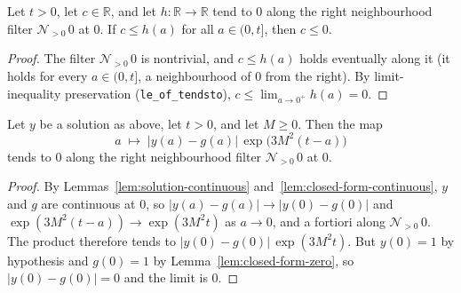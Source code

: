\begin{lemma}
    \label{lem:limit-forces-nonpos}
    \leanok
    Let $t > 0$, let $c \in \mathbb{R}$, and let $h : \mathbb{R} \to \mathbb{R}$
    tend to $0$ along the right neighbourhood filter $\mathcal{N}_{>0}\,0$ at
    $0$. If $c \le h(a)$ for all $a \in (0,t]$, then $c \le 0$.
\end{lemma}
\begin{proof}
    The filter $\mathcal{N}_{>0}\,0$ is nontrivial, and $c \le h(a)$ holds
    eventually along it (it holds for every $a \in (0,t]$, a neighbourhood of
    $0$ from the right). By limit-inequality preservation
    (\texttt{le\_of\_tendsto}), $c \le \lim_{a \to 0^+} h(a) = 0$.
\end{proof}

\begin{lemma}
    \label{lem:gronwall-rhs-tendsto}
    \leanok
    Let $y$ be a solution as above, let $t > 0$, and let $M \ge 0$. Then the map
    \[
        a \;\longmapsto\; \bigl| y(a) - g(a) \bigr|\,\exp\!\bigl(3M^2(t-a)\bigr)
    \]
    tends to $0$ along the right neighbourhood filter $\mathcal{N}_{>0}\,0$ at
    $0$.
\end{lemma}
\begin{proof}
    By Lemmas~\ref{lem:solution-continuous} and~\ref{lem:closed-form-continuous},
    $y$ and $g$ are continuous at $0$, so $|y(a) - g(a)| \to |y(0) - g(0)|$ and
    $\exp(3M^2(t-a)) \to \exp(3M^2 t)$ as $a \to 0$, and a fortiori along
    $\mathcal{N}_{>0}\,0$. The product therefore tends to
    $|y(0) - g(0)|\,\exp(3M^2 t)$. But $y(0) = 1$ by hypothesis and $g(0) = 1$ by
    Lemma~\ref{lem:closed-form-zero}, so $|y(0) - g(0)| = 0$ and the limit is $0$.
\end{proof}

